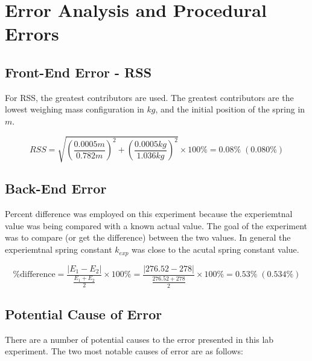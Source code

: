 \chapter{Error Analysis and Procedural Errors}

\section{Front-End Error - RSS}

For RSS, the greatest contributors are used. The greatest contributors are 
the lowest weighing mass configuration in $kg$, and the initial position of 
the spring in $m$.
  
  \begin{equation*}
    RSS = \sqrt{\left( \frac{0.0005m}{0.782m} \right)^2 
    + \left( \frac{0.0005kg}{1.036kg} \right)^2} \times 100\% = 0.08\% \; (0.080\%)
  \end{equation*}

\section{Back-End Error}

Percent difference was employed on this experiment because the experiemtnal value was 
being compared with a known actual value. The goal of the experiment was to compare (or
get the difference) between the two values. In general the experiemtnal spring constant $k_{exp}$
was close to the acutal spring constant value.

\begin{equation*}
  \%\text{difference}= \frac{|E_1 - E_2|}{\frac{E_1 + E_2}{2}} \times 100\% = 
  \frac{|276.52 - 278|}{\frac{276.52 + 278}{2}} \times 100\% = 0.53\% \; (0.534\%)
\end{equation*}

\section{Potential Cause of Error}

\noindent There are a number of potential causes to the error presented in this lab
experiment. The two most notable causes of error are as follows:

